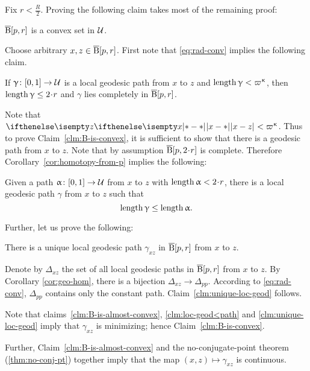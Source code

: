 Fix $r<\tfrac R2$. Proving the following claim takes most of the remaining proof:

\begin{clm}{}\label{clm:B-is-convex}
$\overline{\mathrm{B}}{}[ p,r]$ is a convex set in $\mathcal{U}$.
\end{clm}

Choose arbitrary $x,z\in \cBall[ p,r]$.
First note that \ref{eq:rad-conv} implies the following claim.

\begin{clm}{}\label{clm:B-is-almost-convex}
If $ \gamma\:[0,1]\to\spc{U}$ 
is a local geodesic path from $x$ to $z$ and  
$\length \gamma\z<\varpi\kappa$,  
then $\length \gamma \le 2\cdot r$ 
and $ \gamma$ lies completely in $\overline{\mathrm{B}}{}[ p,r]$.
\end{clm}

Note that  $\dist{x}{z}{}<\varpi\kappa$.
Thus to prove Claim~\ref{clm:B-is-convex}, it is sufficient to show that there is a geodesic path from $x$ to $z$.
Note that by assumption $\cBall[p,2\cdot r]$ is complete.
Therefore Corollary~\ref{cor:homotopy-from-p} implies the following:

\begin{clm}{}\label{clm:loc-geod<path}
Given a path $\alpha\:[0,1]\to\spc{U}$ from $x$ to $z$ with $\length\alpha<2\cdot r$,
there is a local geodesic path $\gamma$ from $x$ to $z$ such that
\[\length\gamma\le\length\alpha.\]

\end{clm}

Further, let us prove the following:

\begin{clm}{}\label{clm:unique-loc-geod}
There is a unique local geodesic path $\gamma_{x z}$ in $\overline{\mathrm{B}}{}[ p,r]$ from $x$ to $z$.
\end{clm}

Denote by $\Delta_{x z}$ the set of all local geodesic paths in $\overline{\mathrm{B}}{}[ p,r]$ from $x$ to $z$.
By Corollary \ref{cor:geo-hom}, there is a  bijection $\Delta_{x z}\to\Delta_{p p}$.
According to \ref{eq:rad-conv}, 
$\Delta_{p p}$ contains only the constant path.
Claim~\ref{clm:unique-loc-geod} follows.


Note that 
claims~\ref{clm:B-is-almost-convex}, 
\ref{clm:loc-geod<path} 
and \ref{clm:unique-loc-geod}
imply that $\gamma_{x z}$ is minimizing; hence Claim~\ref{clm:B-is-convex}.

Further, Claim~\ref{clm:B-is-almost-convex} and the no-conjugate-point theorem (\ref{thm:no-conj-pt}) together 
imply that the map $(x,z)\mapsto\gamma_{x z}$ is continuous.

